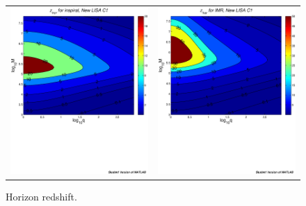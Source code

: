\documentclass{iopart}
\begin{document}
\begin{figure}[H]
\begin{center}
\begin{tabular}{cc}
\includegraphics[scale=0.41,clip=true]{FigEmanuele/C1InspZhorContour.ps}
&\includegraphics[scale=0.41,clip=true]{FigEmanuele/C1IMRZhorContour.ps}\\
\end{tabular}
\caption{\label{fig:SNRMiniLISA4} Horizon redshift.}
\end{center}
\end{figure}
\end{document}
